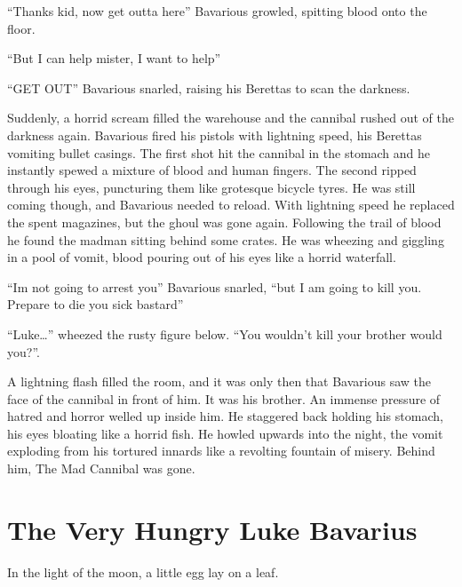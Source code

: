 ``Thanks kid, now get outta here'' Bavarious growled,
spitting blood onto the floor.

``But I can help mister, I want to help''

``GET OUT'' Bavarious snarled, raising his Berettas to
scan the darkness.



Suddenly, a horrid scream filled the warehouse and the cannibal
rushed out of the darkness again. Bavarious fired his pistols with
lightning speed, his Berettas vomiting bullet casings. The first
shot hit the cannibal in the stomach and he instantly spewed a
mixture of blood and human fingers. The second ripped through his
eyes, puncturing them like grotesque bicycle tyres. He was still
coming though, and Bavarious needed to reload. With lightning speed
he replaced the spent magazines, but the ghoul was gone again.
Following the trail of blood he found the madman sitting behind
some crates. He was wheezing and giggling in a pool of vomit, blood
pouring out of his eyes like a horrid waterfall.



``Im not going to arrest you'' Bavarious snarled,
``but I am going to kill you. Prepare to die you sick
bastard''



``Luke{\ldots}'' wheezed the rusty figure below.
``You wouldn't kill your brother would
you?''.



A lightning flash filled the room, and it was only then that
Bavarious saw the face of the cannibal in front of him. It was his
brother. An immense pressure of hatred and horror welled up inside
him. He staggered back holding his stomach, his eyes bloating like
a horrid fish. He howled upwards into the night, the vomit
exploding from his tortured innards like a revolting fountain of
misery. Behind him, The Mad Cannibal was gone.






\chapter{The Very Hungry Luke Bavarius}





In the light of the moon, a little egg lay on a leaf.



